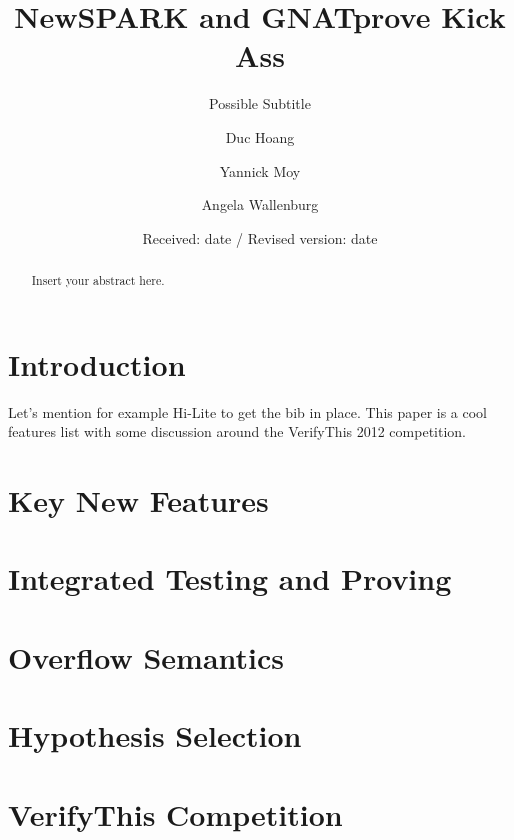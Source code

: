 \documentclass[sttt,draft]{svjour}
\begin{document}
%
\title{NewSPARK and GNATprove Kick Ass}
\subtitle{Possible Subtitle}
\author{Duc Hoang \and Yannick Moy \and Angela Wallenburg
}                     %

\date{Received: date / Revised version: date}
%
\maketitle
%
\begin{abstract}
Insert your abstract here.
\end{abstract}
%
\section{Introduction}
\label{intro}
Let's mention for example Hi-Lite \cite{hiliteERTS2012} to get the bib in place. This paper is a cool features list with some discussion around the VerifyThis 2012 competition.
\section{Key New Features}
\section{Integrated Testing and Proving}
\section{Overflow Semantics}
\section{Hypothesis Selection}
\section{VerifyThis Competition}
\label{verifythis}
%


\end{document}
